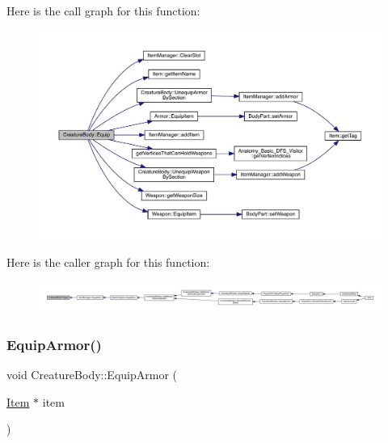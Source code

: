 Here is the call graph for this function\+:
\nopagebreak
\begin{figure}[H]
\begin{center}
\leavevmode
\includegraphics[width=350pt]{da/d7d/class_creature_body_a8a55f2c0785aaf956cdee04a538dfb97_cgraph}
\end{center}
\end{figure}
Here is the caller graph for this function\+:
\nopagebreak
\begin{figure}[H]
\begin{center}
\leavevmode
\includegraphics[width=350pt]{da/d7d/class_creature_body_a8a55f2c0785aaf956cdee04a538dfb97_icgraph}
\end{center}
\end{figure}
\mbox{\label{class_creature_body_a5a14d8decef3d1051ac7e9d79a1a4b72}} 
\subsubsection{\texorpdfstring{Equip\+Armor()}{EquipArmor()}}
{\footnotesize\ttfamily void Creature\+Body\+::\+Equip\+Armor (\begin{DoxyParamCaption}\item[{\mbox{\hyperlink{class_item}{Item}} $\ast$}]{item }\end{DoxyParamCaption})}

\mbox{\label{class_creature_body_af329b825db569100370683f7a9b0263c}} 
